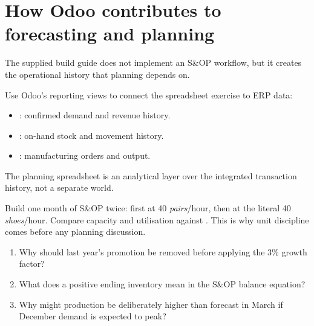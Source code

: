 \section{How Odoo contributes to forecasting and planning}

The supplied build guide does not implement an S\&OP workflow, but it creates the
operational history that planning depends on.

\begin{odoobox}
Use Odoo's reporting views to connect the spreadsheet exercise to ERP data:
\begin{itemize}
  \item {}: confirmed demand and revenue history.
  \item {}: on-hand stock and movement history.
  \item {}: manufacturing orders and output.
\end{itemize}
The planning spreadsheet is an analytical layer over the integrated transaction
history, not a separate world.
\end{odoobox}

\begin{tryit}
Build one month of S\&OP twice: first at 40 \emph{pairs}/hour, then at the literal
40 \emph{shoes}/hour. Compare capacity and utilisation against
. This is why unit discipline comes before any
planning discussion.
\end{tryit}

\begin{quickcheck}
\begin{enumerate}
  \item Why should last year's promotion be removed before applying the 3\% growth factor?
  \item What does a positive ending inventory mean in the S\&OP balance equation?
  \item Why might production be deliberately higher than forecast in March if December demand is expected to peak?
\end{enumerate}
\end{quickcheck}

